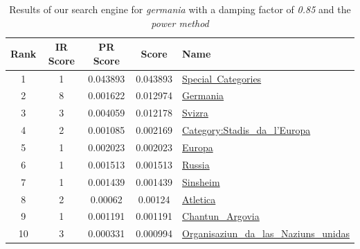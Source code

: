 \documentclass[pdftex,12pt,a4paper]{article}
\begin{document}
\begin{table}[H]
\centering
\begin{tabular}{ | c | c | c | c | l | }
\hline
Rank & IR Score & PR Score &  Score & Name \\ \hline
1 & 1 & 0.043893 & 0.043893 & \href{http://rm.wikipedia.org/wiki/Spezial:Categories}{Special~Categories} \\ \hline
2 & 8 & 0.001622 & 0.012974 & \href{http://rm.wikipedia.org/wiki/Germania}{Germania} \\ \hline
3 & 3 & 0.004059 & 0.012178 & \href{http://rm.wikipedia.org/wiki/Svizra}{Svizra} \\ \hline
4 & 2 & 0.001085 & 0.002169 & \href{http://rm.wikipedia.org/wiki/Categoria:Stadis_da_l'Europa}{Category:Stadis\_da\_l'Europa} \\ \hline
5 & 1 & 0.002023 & 0.002023 & \href{http://rm.wikipedia.org/wiki/Europa}{Europa} \\ \hline
6 & 1 & 0.001513 & 0.001513 & \href{http://rm.wikipedia.org/wiki/Russia}{Russia} \\ \hline
7 & 1 & 0.001439 & 0.001439 & \href{http://rm.wikipedia.org/wiki/Sinsheim}{Sinsheim} \\ \hline
8 & 2 & 0.00062 & 0.00124 & \href{http://rm.wikipedia.org/wiki/Atletica}{Atletica} \\ \hline
9 & 1 & 0.001191 & 0.001191 & \href{http://rm.wikipedia.org/wiki/Chantun_Argovia}{Chantun\_Argovia} \\ \hline
10 & 3 & 0.000331 & 0.000994 & \href{http://rm.wikipedia.org/wiki/Organisaziun_da_las_Naziuns_unidas}{Organisaziun\_da\_las\_Naziuns\_unidas} \\ \hline
\end{tabular}
\caption{Results of our search engine for \emph{germania} with a damping factor of \emph{0.85} and the \emph{power method}}
\label{table_d=0.85}
\end{table}
\end{document}
